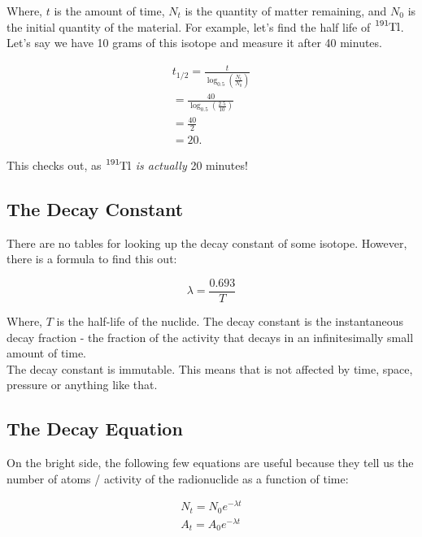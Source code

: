 \documentclass{article}
\begin{document}
\begin{multicols*}{2}
    Where, $t$ is the amount of time, $N_t$ is the quantity of matter remaining,
    and $N_0$ is the initial quantity of the material. For example, let's find
    the half life of $\ce{^{191}Tl}$. Let's say we have 10 grams of this isotope
    and measure it after 40 minutes.

    \begin{equation*}
      \begin{split}
        t_{1/2} = \frac{t}{ \log_{0.5}\left( \frac{N_t}{N_0} \right) } \\
        = \frac{40}{ \log_{0.5}\left( \frac{2.5}{10} \right) } \\
        = \frac{40}{2} \\
        = 20.
      \end{split}
    \end{equation*}
    
    This checks out, as $\ce{^{191}Tl}$ \textit{is actually} 20 minutes!
    \subsection{The Decay Constant}
    There are no tables for looking up the decay constant of some isotope.
    However, there is a formula to find this out:

    \[
      \lambda = \frac{0.693}{T}
    \]

    Where, $T$ is the half-life of the nuclide. The decay constant is the
    instantaneous decay fraction - the fraction of the activity that decays
    in an infinitesimally small amount of time.\\

    The decay constant is immutable. This means that is not affected by time,
    space, pressure or anything like that.
    
    \subsection{The Decay Equation}
    On the bright side, the following few equations are useful because
    they tell us the number of atoms / activity of the radionuclide as
    a function of time:

    \begin{equation*}
      \begin{split}
        N_t = N_{0}e^{-\lambda{t}} \\
        A_t = A_{0}e^{-\lambda{t}} \\
      \end{split}
    \end{equation*}


\end{multicols*}
\end{document}
